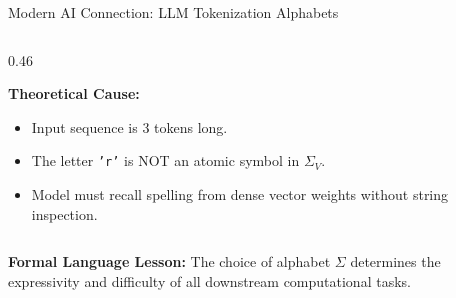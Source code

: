 \documentclass[aspectratio=169, 10pt]{beamer}
\begin{document}
\begin{frame}{Modern AI Connection: LLM Tokenization Alphabets}
\begin{columns}[T]
\begin{column}{0.46\textwidth}
\begin{tcolorbox}[alertcard]
{        \textbf{Theoretical Cause:}
        \begin{itemize}\setlength{\itemsep}{1pt}\scriptsize
          \item Input sequence is 3 tokens long.
          \item The letter \texttt{'r'} is NOT an atomic symbol in $\Sigma_V$.
          \item Model must recall spelling from dense vector weights without string inspection.
        \end{itemize}
        }
      \end{tcolorbox}
    \end{column}
  \end{columns}
  
  \vspace{0.04cm}
  \begin{tcolorbox}[spotlightcard]
    {\scriptsize\textbf{Formal Language Lesson:} The choice of alphabet $\Sigma$ determines the expressivity and difficulty of all downstream computational tasks.}
  \end{tcolorbox}
\end{frame}
\end{document}
